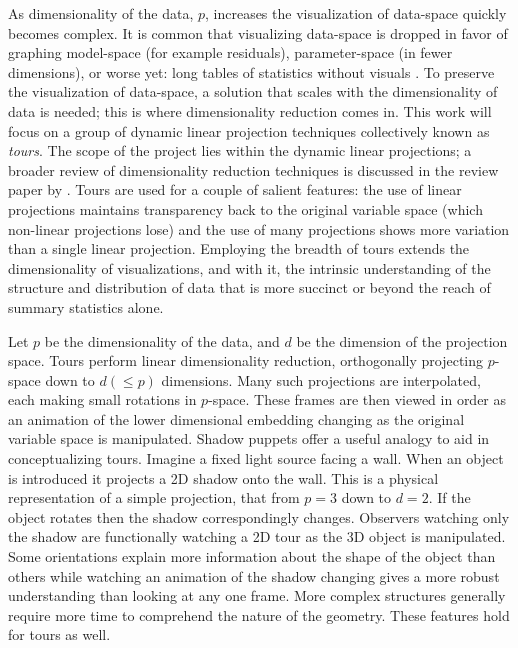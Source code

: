 \documentclass{monashthesis}
\begin{document}
As dimensionality of the data, \(p\), increases the visualization of data-space quickly becomes complex. It is common that visualizing data-space is dropped in favor of graphing model-space (for example residuals), parameter-space (in fewer dimensions), or worse yet: long tables of statistics without visuals \autocite{wickham_visualizing_2015}. To preserve the visualization of data-space, a solution that scales with the dimensionality of data is needed; this is where dimensionality reduction comes in. This work will focus on a group of dynamic linear projection techniques collectively known as \emph{tours}. The scope of the project lies within the dynamic linear projections; a broader review of dimensionality reduction techniques is discussed in the review paper by \textcite{grinstein_high-dimensional_2002}. Tours are used for a couple of salient features: the use of linear projections maintains transparency back to the original variable space (which non-linear projections lose) and the use of many projections shows more variation than a single linear projection. Employing the breadth of tours extends the dimensionality of visualizations, and with it, the intrinsic understanding of the structure and distribution of data that is more succinct or beyond the reach of summary statistics alone.

Let \(p\) be the dimensionality of the data, and \(d\) be the dimension of the projection space. Tours perform linear dimensionality reduction, orthogonally projecting \(p\)-space down to \(d(\leq p)\) dimensions. Many such projections are interpolated, each making small rotations in \(p\)-space. These frames are then viewed in order as an animation of the lower dimensional embedding changing as the original variable space is manipulated. Shadow puppets offer a useful analogy to aid in conceptualizing tours. Imagine a fixed light source facing a wall. When an object is introduced it projects a 2D shadow onto the wall. This is a physical representation of a simple projection, that from \(p=3\) down to \(d=2\). If the object rotates then the shadow correspondingly changes. Observers watching only the shadow are functionally watching a 2D tour as the 3D object is manipulated. Some orientations explain more information about the shape of the object than others while watching an animation of the shadow changing gives a more robust understanding than looking at any one frame. More complex structures generally require more time to comprehend the nature of the geometry. These features hold for tours as well.
\end{document}
